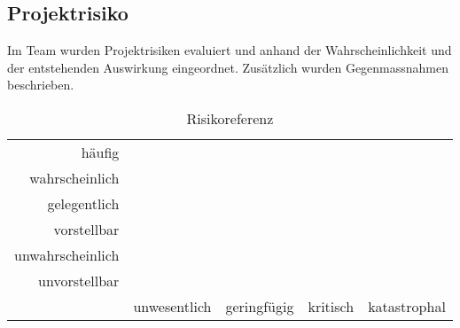 \subsection{Projektrisiko}

Im Team wurden Projektrisiken evaluiert und anhand der Wahrscheinlichkeit und der entstehenden Auswirkung eingeordnet. Zusätzlich wurden Gegenmassnahmen beschrieben.

\begin{table}[h!]
	\centering
	\begin{tabular}{r || c c c c}
		häufig 		
		& \cellcolor{red} 
		& \cellcolor{red}
		& \cellcolor{red}
		& \cellcolor{red} \\
		wahrscheinlich		
		& \cellcolor{yellow} 
		& \cellcolor{yellow} 
		& \cellcolor{red}
		& \cellcolor{red} \\
		gelegentlich		
		& \cellcolor{yellow}
		& \cellcolor{yellow}
		& \cellcolor{yellow}
		& \cellcolor{red} \\
		vorstellbar		
		& \cellcolor{green}
		& \cellcolor{yellow}
		& \cellcolor{yellow}
		& \cellcolor{yellow} \\
		unwahrscheinlich	
		& \cellcolor{green}
		& \cellcolor{green}
		& \cellcolor{yellow}
		& \cellcolor{yellow} \\
		unvorstellbar		
		& \cellcolor{green}
		& \cellcolor{green}
		& \cellcolor{green}
		& \cellcolor{green} \\
		\hline
		& unwesentlich & geringfügig & kritisch & katastrophal
	\end{tabular}
	\caption{Risikoreferenz}
	\label{tab:risikoreferenz}
\end{table}


